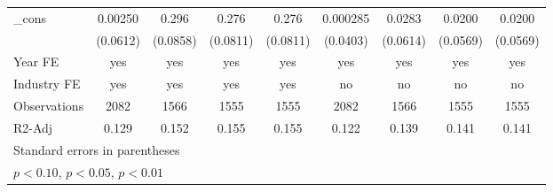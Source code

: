 \begin{table}[htbp]
\begin{tabular}{l*{8}{c}}
\_cons              &     0.00250         &       0.296\sym{***}&       0.276\sym{***}&       0.276\sym{***}&    0.000285         &      0.0283         &      0.0200         &      0.0200         \\
                    &    (0.0612)         &    (0.0858)         &    (0.0811)         &    (0.0811)         &    (0.0403)         &    (0.0614)         &    (0.0569)         &    (0.0569)         \\
\hline
Year FE             &         yes         &         yes         &         yes         &         yes         &         yes         &         yes         &         yes         &         yes         \\
Industry FE         &         yes         &         yes         &         yes         &         yes         &          no         &          no         &          no         &          no         \\
Observations        &        2082         &        1566         &        1555         &        1555         &        2082         &        1566         &        1555         &        1555         \\
R2-Adj              &       0.129         &       0.152         &       0.155         &       0.155         &       0.122         &       0.139         &       0.141         &       0.141         \\
\hline\hline
\multicolumn{9}{l}{\footnotesize Standard errors in parentheses}\\
\multicolumn{9}{l}{\footnotesize \sym{*} \(p<0.10\), \sym{**} \(p<0.05\), \sym{***} \(p<0.01\)}\\
\end{tabular}
\end{table}
